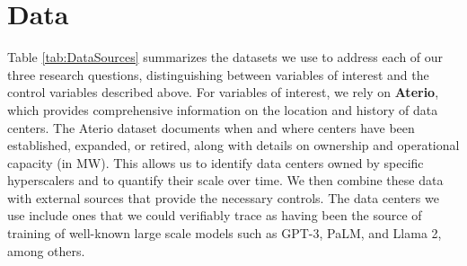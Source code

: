\documentclass[a4paper,fleqn,longmktitle]{cas-sc}
\newcommand{\nb}[1]{\textcolor{blue}{NB[#1]}}
\theoremstyle{plain}
\theoremstyle{definition}
\begin{document}
\section{Data}\label{sectionData}
Table \ref{tab:DataSources} summarizes the datasets we use to address each of our three research questions, distinguishing between variables of interest and the control variables described above. For variables of interest, we rely on \textbf{Aterio}, which provides comprehensive information on the location and history of data centers. The Aterio dataset documents when and where centers have been established, expanded, or retired, along with details on ownership and operational capacity (in MW). This allows us to identify data centers owned by specific hyperscalers and to quantify their scale over time. We then combine these data with external sources that provide the necessary controls. 
The data centers we use include ones that we could verifiably trace as having been the source of training of well-known large scale models such as GPT-3, PaLM, and Llama 2, among others.
\end{document}
